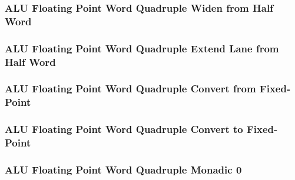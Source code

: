 

\subsubsection[{\small ALU Floating Point Word Quadruple Widen from Half Word}]{ALU Floating Point Word Quadruple Widen from Half Word} \label{sec:format-ALU-FWQWIDEWR}



\subsubsection[{\small ALU Floating Point Word Quadruple Extend Lane from Half Word}]{ALU Floating Point Word Quadruple Extend Lane from Half Word} \label{sec:format-ALU-FWQEXTLWR}



\subsubsection[{\small ALU Floating Point Word Quadruple Convert from Fixed-Point}]{ALU Floating Point Word Quadruple Convert from Fixed-Point} \label{sec:format-ALU-FWQFLOAT}



\subsubsection[{\small ALU Floating Point Word Quadruple Convert to Fixed-Point}]{ALU Floating Point Word Quadruple Convert to Fixed-Point} \label{sec:format-ALU-FWQFIXED}



\subsubsection[{\small ALU Floating Point Word Quadruple Monadic 0}]{ALU Floating Point Word Quadruple Monadic 0} \label{sec:format-ALU-FWQMO0}

